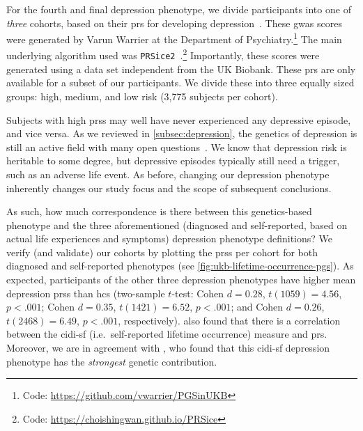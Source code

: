 For the fourth and final depression phenotype, we divide participants into one of \emph{three} cohorts, based on their \gls{prs} for developing depression~\parencite{Bycroft2018}.
These \gls{gwas} scores were generated by Varun Warrier at the Department of Psychiatry.\footnote{Code: \url{https://github.com/vwarrier/PGSinUKB}}
The main underlying algorithm used was \texttt{PRSice2}~\parencite{Choi2019}.\footnote{Code: \url{https://choishingwan.github.io/PRSice}}
Importantly, these scores were generated using a data set independent from the UK Biobank.
These \gls{prs} are only available for a subset of our participants.
We divide these into three equally sized groups: high, medium, and low risk (3,775 subjects per cohort).

Subjects with high \glspl{prs} may well have never experienced any depressive episode, and vice versa.
As we reviewed in \cref{subsec:depression}, the genetics of depression is still an active field with many open questions~\parencite{Ormel2019}.
We know that depression risk is heritable to some degree, but depressive episodes typically still need a trigger, such as an adverse life event.
As before, changing our depression phenotype inherently changes our study focus and the scope of subsequent conclusions.

As such, how much correspondence is there between this genetics-based phenotype and the three aforementioned (diagnosed and self-reported, based on actual life experiences and symptoms) depression phenotype definitions?
We verify (and validate) our cohorts by plotting the \glspl{prs} per cohort for both diagnosed and self-reported phenotypes (see \cref{fig:ukb-lifetime-occurrence-pgs}).
As expected, participants of the other three depression phenotypes have higher mean depression \glspl{prs} than \glspl{hc} (two-sample $t$-test: Cohen $d = 0.28$, $t(1059) = 4.56$, $p < .001$; Cohen $d = 0.35$, $t(1421) = 6.52$, $p < .001$; and Cohen $d = 0.26$, $t(2468) = 6.49$, $p < .001$, respectively).
\textcite{Glanville2021} also found that there is a correlation between the \gls{cidi-sf} (i.e.~self-reported lifetime occurrence) measure and \gls{prs}.
Moreover, we are in agreement with \textcite{Cai2020}, who found that this \gls{cidi-sf} depression phenotype has the \emph{strongest} genetic contribution.


